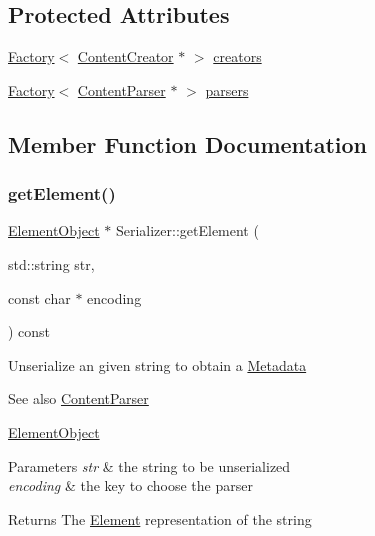 \subsection*{Protected Attributes}
\begin{DoxyCompactItemize}
\item 
\mbox{\hyperlink{classFactory}{Factory}}$<$ \mbox{\hyperlink{classContentCreator}{Content\+Creator}} $\ast$ $>$ \mbox{\hyperlink{classSerializer_a7d26e865966b304350653b1246ec3340}{creators}}
\item 
\mbox{\hyperlink{classFactory}{Factory}}$<$ \mbox{\hyperlink{classContentParser}{Content\+Parser}} $\ast$ $>$ \mbox{\hyperlink{classSerializer_a96f96c01e6a471513669621751591fd9}{parsers}}
\end{DoxyCompactItemize}


\subsection{Member Function Documentation}
\mbox{\label{classSerializer_ab3bcdbd49167109de13e03878337018a}} 
\subsubsection{\texorpdfstring{get\+Element()}{getElement()}}
{\footnotesize\ttfamily \mbox{\hyperlink{classElementObject}{Element\+Object}} $\ast$ Serializer\+::get\+Element (\begin{DoxyParamCaption}\item[{std\+::string}]{str,  }\item[{const char $\ast$}]{encoding }\end{DoxyParamCaption}) const\hspace{0.3cm}{\ttfamily [inherited]}}

Unserialize an given string to obtain a \mbox{\hyperlink{classMetadata}{Metadata}} \begin{DoxySeeAlso}{See also}
\mbox{\hyperlink{classContentParser}{Content\+Parser}} 

\mbox{\hyperlink{classElementObject}{Element\+Object}}
\end{DoxySeeAlso}

\begin{DoxyParams}{Parameters}
{\em str} & the string to be unserialized \\
\hline
{\em encoding} & the key to choose the parser \\
\hline
\end{DoxyParams}
\begin{DoxyReturn}{Returns}
The \mbox{\hyperlink{classElement}{Element}} representation of the string 
\end{DoxyReturn}
\mbox{\label{classSerializer_a5cfe31eb70f4d0c92f2d68c22f39e885}} 
